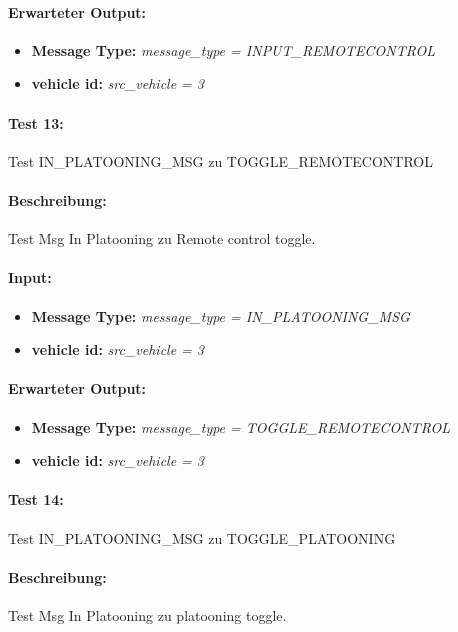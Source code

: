 \documentclass[a4paper, 12pt, titlepage]{scrartcl}
\begin{document}
{			\paragraph{Erwarteter Output:}
			\begin{itemize} \itemsep-0.5em
				\item \textbf{Message Type:} \emph{message\_type = INPUT\_REMOTECONTROL}
				\item \textbf{vehicle id:} \emph{src\_vehicle = 3}
			\end{itemize}				
			
			\paragraph{Test 13:}{Test IN\_PLATOONING\_MSG zu TOGGLE\_REMOTECONTROL}
			\paragraph{Beschreibung:} Test Msg In Platooning zu Remote control toggle.
			\paragraph{Input:}
			\begin{itemize} \itemsep-0.5em
				\item \textbf{Message Type:} \emph{message\_type = IN\_PLATOONING\_MSG}
				\item \textbf{vehicle id:} \emph{src\_vehicle = 3}
			\end{itemize}
			\paragraph{Erwarteter Output:}
			\begin{itemize} \itemsep-0.5em
				\item \textbf{Message Type:} \emph{message\_type = TOGGLE\_REMOTECONTROL}
				\item \textbf{vehicle id:} \emph{src\_vehicle = 3}
			\end{itemize}
			
			\paragraph{Test 14:}{Test IN\_PLATOONING\_MSG zu TOGGLE\_PLATOONING}
			\paragraph{Beschreibung:} Test Msg In Platooning zu platooning toggle.
}
\end{document}

